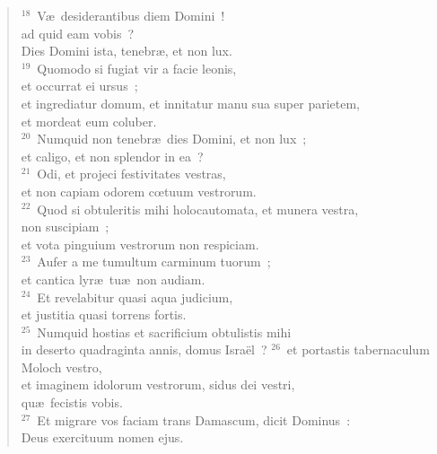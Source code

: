 \begin{flushleft}\begin{verse}${}^{18}$~V\ae\ desiderantibus diem Domini~!\\ ad quid eam vobis~?\\ Dies Domini ista, tenebr\ae , et non lux.\\
${}^{19}$~Quomodo si fugiat vir a facie leonis,\\ et occurrat ei ursus~;\\ et ingrediatur domum, et innitatur manu sua super parietem,\\ et mordeat eum coluber.\\
${}^{20}$~Numquid non tenebr\ae\ dies Domini, et non lux~;\\ et caligo, et non splendor in ea~?\\
${}^{21}$~Odi, et projeci festivitates vestras,\\ et non capiam odorem cœtuum vestrorum.\\
${}^{22}$~Quod si obtuleritis mihi holocautomata, et munera vestra,\\ non suscipiam~;\\ et vota pinguium vestrorum non respiciam.\\
${}^{23}$~Aufer a me tumultum carminum tuorum~;\\ et cantica lyr\ae\ tu\ae\ non audiam.\\
${}^{24}$~Et revelabitur quasi aqua judicium,\\ et justitia quasi torrens fortis.\\
${}^{25}$~Numquid hostias et sacrificium obtulistis mihi\\ in deserto quadraginta annis, domus Isra\"el~?
${}^{26}$~et portastis tabernaculum Moloch vestro,\\ et imaginem idolorum vestrorum, sidus dei vestri,\\ qu\ae\ fecistis vobis.\\
${}^{27}$~Et migrare vos faciam trans Damascum, dicit Dominus~:\\ Deus exercituum nomen ejus.\end{verse}\end{flushleft}


